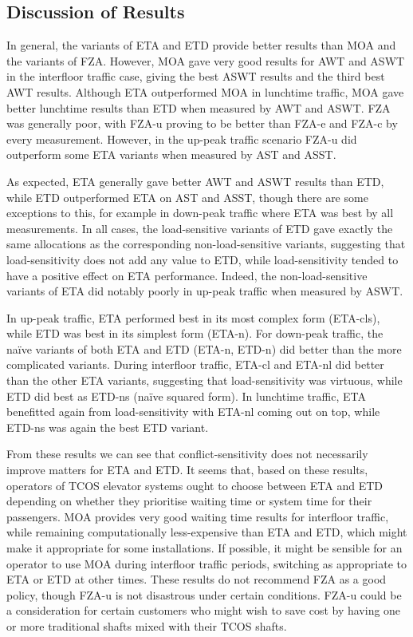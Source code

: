 \documentclass{UoYCSproject}
\begin{document}
\subsection{Discussion of Results}

In general, the variants of ETA and ETD provide better results than MOA and the variants of FZA.  However, MOA gave very good results for AWT and ASWT in the interfloor traffic case, giving the best ASWT results and the third best AWT results.  Although ETA outperformed MOA in lunchtime traffic, MOA gave better lunchtime results than ETD when measured by AWT and ASWT.  FZA was generally poor, with FZA-u proving to be better than FZA-e and FZA-c by every measurement.  However, in the up-peak traffic scenario FZA-u did outperform some ETA variants when measured by AST and ASST.

As expected, ETA generally gave better AWT and ASWT results than ETD, while ETD outperformed ETA on AST and ASST, though there are some exceptions to this, for example in down-peak traffic where ETA was best by all measurements.  In all cases, the load-sensitive variants of ETD gave exactly the same allocations as the corresponding non-load-sensitive variants, suggesting that load-sensitivity does not add any value to ETD, while load-sensitivity tended to have a positive effect on ETA performance.  Indeed, the non-load-sensitive variants of ETA did notably poorly in up-peak traffic when measured by ASWT.

In up-peak traffic, ETA performed best in its most complex form (ETA-cls), while ETD was best in its simplest form (ETA-n).  For down-peak traffic, the na\"{i}ve variants of both ETA and ETD (ETA-n, ETD-n) did better than the more complicated variants.  During interfloor traffic, ETA-cl and ETA-nl did better than the other ETA variants, suggesting that load-sensitivity was virtuous, while ETD did best as ETD-ns (na\"{i}ve squared form).  In lunchtime traffic, ETA benefitted again from load-sensitivity with ETA-nl coming out on top, while ETD-ns was again the best ETD variant.

From these results we can see that conflict-sensitivity does not necessarily improve matters for ETA and ETD.  It seems that, based on these results, operators of TCOS elevator systems ought to choose between ETA and ETD depending on whether they prioritise waiting time or system time for their passengers.  MOA provides very good waiting time results for interfloor traffic, while remaining computationally less-expensive than ETA and ETD, which might make it appropriate for some installations.  If possible, it might be sensible for an operator to use MOA during interfloor traffic periods, switching as appropriate to ETA or ETD at other times.  These results do not recommend FZA as a good policy, though FZA-u is not disastrous under certain conditions.  FZA-u could be a consideration for certain customers who might wish to save cost by having one or more traditional shafts mixed with their TCOS shafts.
\end{document}
